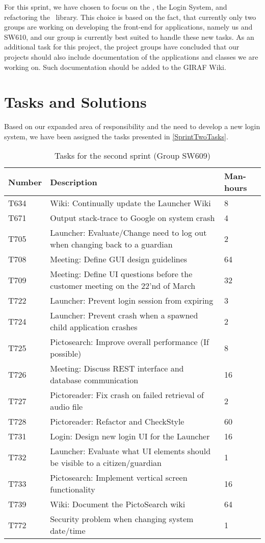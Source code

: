 For this sprint, we have chosen to focus on the \lapp, the Login System,
and refactoring the \plib\ library. This choice is based on the fact,
that currently only two groups are working on developing the front-end for
applications, namely us and SW610, and our group is currently best suited to
handle these new tasks. As an additional task for this project, the project
groups have concluded that our projects should also include documentation of
the applications and classes we are working on. Such documentation should be
added to the GIRAF Wiki.

\section{Tasks and Solutions}
Based on our expanded area of responsibility and the need to develop a new login
system, we have been assigned the tasks presented in \autoref{SprintTwoTasks}.

\begin{table}[H]
\centering
\begin{tabular}{|l|p{10cm}|l|}
\hline
Number	& Description & Man-hours												\\\hline
T634  	& Wiki: Continually update the Launcher Wiki & 8\\\hline 
T671    & Output stack-trace to Google on system crash & 4
\\\hline 
T705	& Launcher: Evaluate/Change need to log out when changing back to a
guardian & 2 \\\hline 
T708    & Meeting: Define GUI design guidelines & 64\\\hline
T709	& Meeting: Define UI questions before the customer meeting on the
22'nd of March & 32 \\\hline 
T722   	& Launcher: Prevent login session from expiring & 3 \\\hline 
T724   	& Launcher: Prevent crash when a spawned child application crashes &
2\\\hline T725  	& Pictosearch: Improve overall performance (If possible)	& 8 \\\hline 
T726    & Meeting: Discuss REST interface and database communication & 16
\\\hline 
T727    & Pictoreader: Fix crash on failed retrieval of audio file  & 2				\\\hline 
T728	& Pictoreader: Refactor and CheckStyle  & 60\\\hline
T731    & Login: Design new login UI for the Launcher & 16     			\\\hline
T732    & Launcher: Evaluate what UI elements should be visible to a
citizen/guardian & 1\\\hline 
T733    & Pictosearch: Implement vertical screen functionality & 16   		
\\\hline 
T739    & Wiki: Document the PictoSearch wiki & 64	\\\hline
T772    & Security problem when changing system date/time & 1 \\\hline
\end{tabular}
\caption{Tasks for the second sprint (Group SW609)} 
\label{SprintTwoTasks}    
\end{table} 

